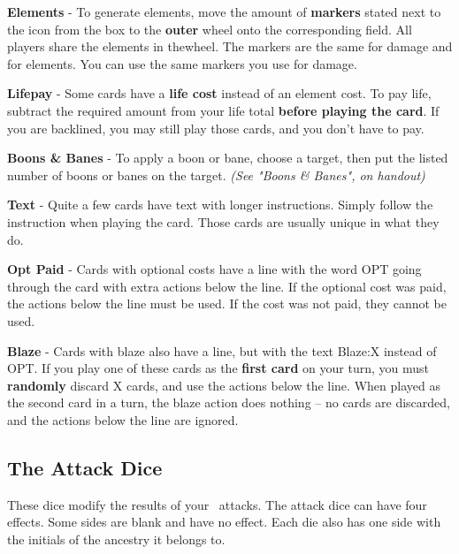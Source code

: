 \textbf{Elements \symFire \symEarth \symMetal \symWater \symWood} - To generate elements, move the amount of \textbf{markers} stated next to the icon from the box to the \textbf{outer} wheel onto the corresponding field. All players share the elements in thewheel. The markers are the same for damage and for elements. You can use the same markers you use for damage.

\textbf{Lifepay \symLife} - Some cards have a \textbf{life cost} instead of an element cost. To pay life, subtract the required amount from your life total \textbf{before playing the card}. If you are backlined, you may still play those cards, and you don't have to pay.

\textbf{Boons \& Banes} - To apply a boon or bane, choose a target, then put the listed number of boons or banes on the target. \textit{(See "Boons \& Banes", on handout)}

\textbf{Text} - Quite a few cards have text with longer instructions. Simply follow the instruction when playing the card. Those cards are usually unique in what they do.


\textbf{Opt Paid} - Cards with optional costs have a line with the word OPT going through the card with extra actions below the line.
If the optional cost was paid, the actions below the line must be used. If the cost was not paid, they cannot be used.

\textbf{Blaze \symBlaze} - Cards with blaze also have a line, but with the text Blaze:X instead of OPT.
If you play one of these cards as the  \textbf{first card} on your turn, you must \textbf{randomly} discard X cards, and use the actions below the line.
When played as the second card in a turn, the blaze action does nothing -- no cards are discarded, and the actions below the line are ignored.

	


\newpage

\subsection{The Attack Dice}
\label{Section_AncestryDice}
These dice modify the results of your \symAttack~attacks.
The attack dice can have four effects. Some sides are blank and have no effect. Each die also has one side with the initials of the ancestry it belongs to.

